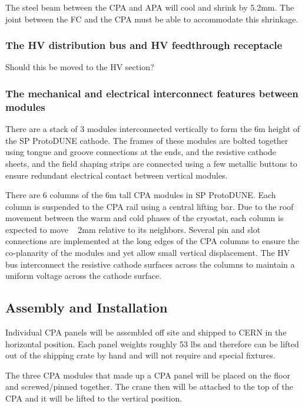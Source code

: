 The steel beam between the CPA and APA will cool and shrink by 5.2mm.  The joint between the FC and the CPA must be able to accommodate this shrinkage.


\subsubsection{The HV distribution bus and HV feedthrough receptacle }

Should this be moved to the HV section?

\subsubsection{The mechanical and electrical interconnect features between modules}

There are a stack of 3 modules interconnected vertically to form the 6m height of the SP ProtoDUNE cathode.  The frames of these modules are bolted together using tongue and groove connections at the ends, and the resistive cathode sheets, and the field shaping strips are connected  using a few metallic buttons to ensure redundant electrical contact between vertical modules.

There are 6 columns of the 6m tall CPA modules in SP ProtoDUNE.  Each column is suspended to the CPA rail using a central lifting bar.  Due to the  roof movement between the warm and cold phases of the cryostat, each column is expected to move ~ 2mm relative to its neighbors.  Several pin and slot connections are implemented at the long edges of the CPA columns to ensure the co-planarity of the modules and yet allow small vertical displacement.  The HV bus interconnect the resistive cathode surfaces across the columns to maintain a uniform voltage across the cathode surface.


\subsection{Assembly  and Installation }

Individual CPA panels will be assembled off site and shipped to CERN in the horizontal position.  Each panel weights roughly 53 lbs and therefore can be lifted out of the shipping crate by hand and will not require and special fixtures.

The three CPA modules that made up a CPA panel will be placed on the floor and screwed/pinned together.   The crane then will be attached to the top of the CPA and it will be lifted to the vertical position.  

